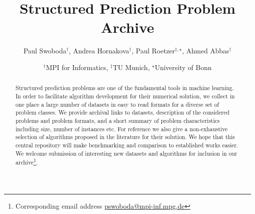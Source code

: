 \documentclass[twocolumn]{article}
\title{Structured Prediction Problem Archive}
\author{Paul Swoboda$^\dagger$, Andrea Hornakova$^\dagger$, Paul Roetzer$^{\ddagger,\star}$, Ahmed Abbas$^\dagger$}
\date{%
$^\dagger$MPI for Informatics, %
$^\ddagger$TU Munich, %
$^\star$University of Bonn %
}
\begin{document}
\maketitle

\begin{abstract}
Structured prediction problems are one of the fundamental tools in machine learning.
In order to facilitate algorithm development for their numerical solution, we collect in one place a large number of datasets in easy to read formats for a diverse set of problem classes.
We provide archival links to datasets, description of the considered problems and problem formats, and a short summary of problem characteristics including size, number of instances etc.
For reference we also give a non-exhaustive selection of algorithms proposed in the literature for their solution.
We hope that this central repository will make benchmarking and comparison to established works easier.
    We welcome submission of interesting new datasets and algorithms for inclusion in our archive\footnote{Corresponding email address \href{mailto:pswoboda@mpi-inf.mpg.de}{pswoboda@mpi-inf.mpg.de}}.
\end{abstract}

\tableofcontents

\clearpage



\clearpage

\clearpage

%
\clearpage

%
\clearpage

\clearpage

\clearpage

\clearpage

\clearpage

\clearpage

\clearpage


{\small


} 

\end{document}
